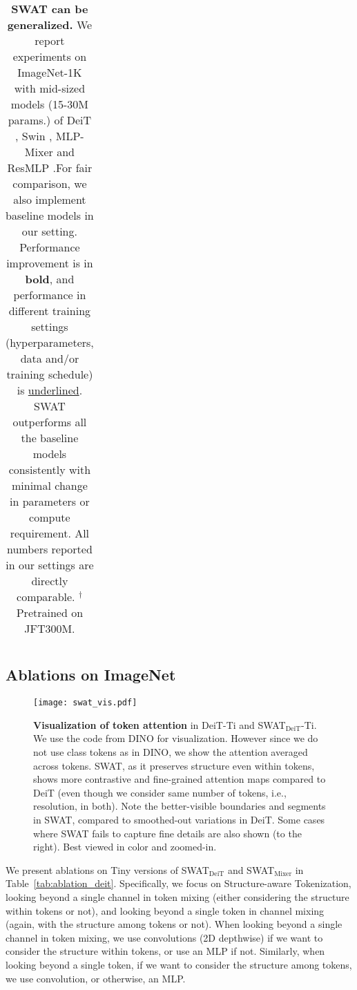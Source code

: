 \documentclass[10pt,twocolumn,letterpaper]{article}
\newcommand{\tref}[1]{Table~\ref{#1}}
\begin{document}
\begin{table}[t!]
{\begin{tabular}{l|c|c|r|r|r}
			
	\end{tabular}}
	\vspace{-1mm}
	\caption{\textbf{SWAT can be generalized.} We report experiments on ImageNet-1K with mid-sized models (15-30M params.) of DeiT \cite{touvron2021deit}, Swin \cite{liu2021swin}, MLP-Mixer \cite{tolstikhin2021mixer} and ResMLP \cite{touvron2021resmlp}.For fair comparison, we also implement baseline models in our setting. Performance improvement is in \textbf{bold}, and performance in different training settings (hyperparameters, data and/or training schedule) is \underline{underlined}.
		SWAT outperforms all the baseline models consistently with minimal change in parameters or compute requirement. All numbers reported in our settings are directly comparable. %
		$^\dagger$Pretrained on JFT300M. %
	}
	\vspace{-3mm}
	\label{tab:midsize}
\end{table}



\subsection{Ablations on ImageNet}

\begin{figure*}[t!]
	\centering
	\texttt{[image: swat\_vis.pdf]}
	\caption{\textbf{Visualization of token attention} in DeiT-Ti \cite{touvron2021deit} and SWAT$_\text{DeiT}$-Ti. We use the code from DINO \cite{caron2021emerging} for visualization. However since we do not use class tokens as in DINO, we show the attention averaged across tokens. SWAT, as it preserves structure even within tokens, shows more contrastive and fine-grained attention maps compared to DeiT (even though we consider same number of tokens, i.e., resolution, in both). Note the better-visible boundaries and segments in SWAT, compared to smoothed-out variations in DeiT. Some cases where SWAT fails to capture fine details are also shown (to the right). Best viewed in color and zoomed-in.
	}
	\label{fig:attn_vis}
\end{figure*}

We present ablations on Tiny versions of SWAT$_\text{DeiT}$ and SWAT$_\text{Mixer}$ in \tref{tab:ablation_deit}. Specifically, we focus on Structure-aware Tokenization, looking beyond a single channel in token mixing (either considering the structure within tokens or not), and looking beyond a single token in channel mixing (again, with the structure among tokens or not). When looking beyond a single channel in token mixing, we use convolutions (2D depthwise) if we want to consider the structure within tokens, or use an MLP if not. Similarly, when looking beyond a single token, if we want to consider the structure among tokens, we use convolution, or otherwise, an MLP. 
\end{document}
